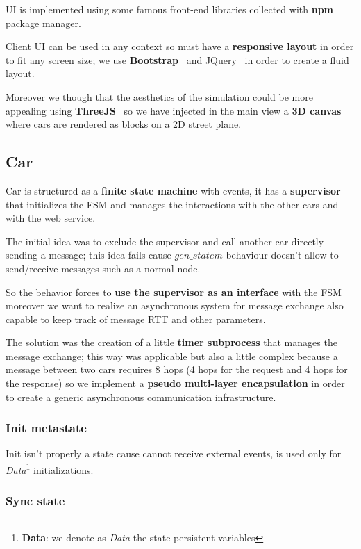 UI is implemented using some famous front-end libraries collected with 
\textbf{npm}~\cite{16} package manager. 

Client UI can be used in any context so must have a \textbf{responsive layout} in order 
to fit any screen size; we use \textbf{Bootstrap}~\cite{19} and JQuery~\cite{20} 
in order to create a fluid layout. 

Moreover we though that the aesthetics of the simulation could be more appealing 
using \textbf{ThreeJS}~\cite{21} so we have injected in the main view a \textbf{3D canvas} 
where cars are rendered as blocks on a 2D street plane.


\subsection{Car}

Car is structured as a \textbf{finite state machine} with events, 
it has a \textbf{supervisor} that initializes the FSM and manages the interactions 
with the other cars and with the web service. 

The initial idea was to exclude the supervisor and call another car directly sending 
a message; this idea fails cause $gen\_statem$ behaviour doesn't allow to send/receive 
messages such as a normal node. 

So the behavior forces to \textbf{use the supervisor as an interface} with the FSM 
moreover we want to realize an asynchronous system for message exchange also 
capable to keep track of message RTT and other parameters. 

The solution was the creation of a little \textbf{timer subprocess} that manages the 
message exchange; this way was applicable but also a little complex because 
a message between two cars requires 8 hops (4 hops for the request and 4 hops for 
the response) so we implement a \textbf{pseudo multi-layer encapsulation} in order 
to create a generic asynchronous communication infrastructure.    


\subsubsection{Init metastate}

Init isn't properly a state cause cannot receive external events, 
is used only for 
\textit{Data}\footnote{\textbf{Data}: we denote as \textit{Data} 
the state persistent variables} 
initializations.


\subsubsection{Sync state}

